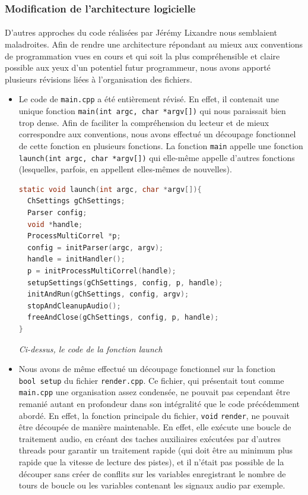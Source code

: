 \subsubsection{Modification de l'architecture logicielle}
\paragraph{}
D'autres approches du code réalisées par Jérémy Lixandre nous
semblaient maladroites. Afin de rendre une architecture répondant au
mieux aux conventions de programmation vues en cours et qui soit la
plus compréhensible et claire possible aux yeux d'un potentiel futur
programmeur, nous avons apporté plusieurs révisions liées à
l'organisation des fichiers.
\begin{itemize}
 \item Le code de \verb!main.cpp! a été entièrement révisé. En effet,
       il contenait une unique fonction
       \verb!main(int argc, char *argv[])! qui nous paraissait bien trop
       dense. Afin de faciliter la compréhension du lecteur et de mieux
       correspondre aux conventions, nous avons effectué un découpage
       fonctionnel de cette fonction en plusieurs fonctions. La fonction
       \verb!main! appelle une fonction
       \verb!launch(int argc, char *argv[])! qui elle-même appelle
       d'autres fonctions (lesquelles, parfois, en appellent elles-mêmes
       de nouvelles).
       
       \begin{lstlisting}[language=C, frame=single, breaklines=true]
static void launch(int argc, char *argv[]){
  ChSettings gChSettings;
  Parser config;
  void *handle;
  ProcessMultiCorrel *p;
  config = initParser(argc, argv);
  handle = initHandler();
  p = initProcessMultiCorrel(handle);
  setupSettings(gChSettings, config, p, handle);
  initAndRun(gChSettings, config, argv);
  stopAndCleanupAudio();
  freeAndClose(gChSettings, config, p, handle);
}
 \end{lstlisting}
 
 \begin{center}
  \textit{Ci-dessus, le code de la fonction launch}
 \end{center}
 
 \item Nous avons de même effectué un découpage fonctionnel sur la
       fonction \\ \verb!bool setup!  du fichier \verb!render.cpp!. Ce
       fichier, qui présentait tout comme \verb!main.cpp! une
       organisation assez condensée, ne pouvait pas cependant être
       remanié autant en profondeur dans son intégralité que le code
       précédemment abordé. En effet, la fonction principale du
       fichier, \verb!void!  \verb!render!, ne pouvait être découpée de
       manière maintenable. En effet, elle exécute une boucle de
       traitement audio, en créant des taches auxiliaires exécutées par
       d'autres threads pour garantir un traitement rapide (qui doit
       être au minimum plus rapide que la vitesse de lecture des
       pistes), et il n'était pas possible de la découper sans créer de
       conflits sur les variables enregistrant le nombre de tours de
       boucle ou les variables contenant les signaux audio par exemple.
       

\end{itemize}
